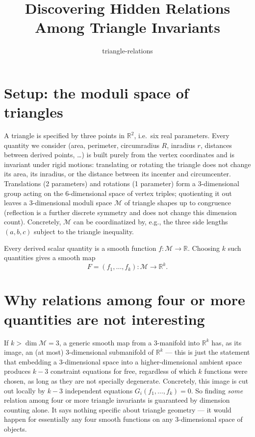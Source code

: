\documentclass[11pt]{article}
\title{Discovering Hidden Relations Among Triangle Invariants}
\author{triangle-relations}
\date{}
\newcommand{\M}{\mathcal{M}}
\begin{document}
\maketitle

\section{Setup: the moduli space of triangles}

A triangle is specified by three points in $\mathbb{R}^2$, i.e.\ six real
parameters. Every quantity we consider (area, perimeter, circumradius $R$,
inradius $r$, distances between derived points, \dots) is built purely from
the vertex coordinates and is invariant under rigid motions: translating or
rotating the triangle does not change its area, its inradius, or the
distance between its incenter and circumcenter. Translations (2 parameters)
and rotations (1 parameter) form a 3-dimensional group acting on the
6-dimensional space of vertex triples; quotienting it out leaves a
$3$-dimensional moduli space $\M$ of triangle shapes up to congruence
(reflection is a further discrete symmetry and does not change this
dimension count). Concretely, $\M$ can be coordinatized by, e.g., the three
side lengths $(a,b,c)$ subject to the triangle inequality.

Every derived scalar quantity is a smooth function $f : \M \to \mathbb{R}$.
Choosing $k$ such quantities gives a smooth map
\[
  F = (f_1, \dots, f_k) : \M \to \mathbb{R}^k .
\]

\section{Why relations among four or more quantities are not interesting}

If $k > \dim \M = 3$, a generic smooth map from a 3-manifold into
$\mathbb{R}^k$ has, as its image, an (at most) 3-dimensional submanifold of
$\mathbb{R}^k$ — this is just the statement that embedding a 3-dimensional
space into a higher-dimensional ambient space produces $k-3$ constraint
equations for free, regardless of which $k$ functions were chosen, as long
as they are not specially degenerate. Concretely, this image is cut out
locally by $k-3$ independent equations $G_i(f_1,\dots,f_k) = 0$. So finding
\emph{some} relation among four or more triangle invariants is guaranteed by
dimension counting alone. It says nothing specific about triangle geometry —
it would happen for essentially any four smooth functions on any
3-dimensional space of objects.
\end{document}
